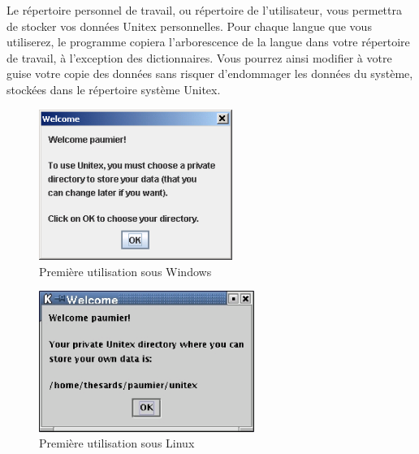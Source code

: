 \bigskip
\noindent Le répertoire personnel de travail, ou répertoire de l'utilisateur, vous permettra de stocker vos
données Unitex personnelles. Pour chaque langue que vous utiliserez, le
programme copiera l’arborescence de la langue dans votre répertoire de travail,
à l’exception des dictionnaires. Vous pourrez ainsi modifier à votre guise votre copie des données
sans risquer d’endommager les données du système, stockées dans le
répertoire système Unitex.


\begin{figure}[h]
\begin{center}
\includegraphics[width=6.3cm]{resources/img/fig1-1.png}
\caption{Première utilisation sous Windows}
\end{center}
\end{figure}

\begin{figure}[h]
\begin{center}
\includegraphics[width=7cm]{resources/img/fig1-2.png}
\caption{Première utilisation sous Linux}
\end{center}
\end{figure}

